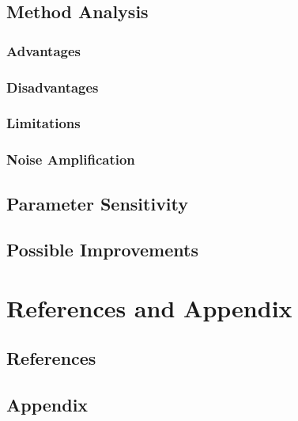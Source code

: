 \documentclass[12pt,a4paper]{article}
\begin{document}
\subsection{Method Analysis} %
\subsubsection{Advantages} %
\subsubsection{Disadvantages} %
\subsubsection{Limitations} %
\subsubsection{Noise Amplification} %
\subsection{Parameter Sensitivity} %
\subsection{Possible Improvements} %

\section{References and Appendix} %
\subsection{References}
\subsection{Appendix}
\end{document}
